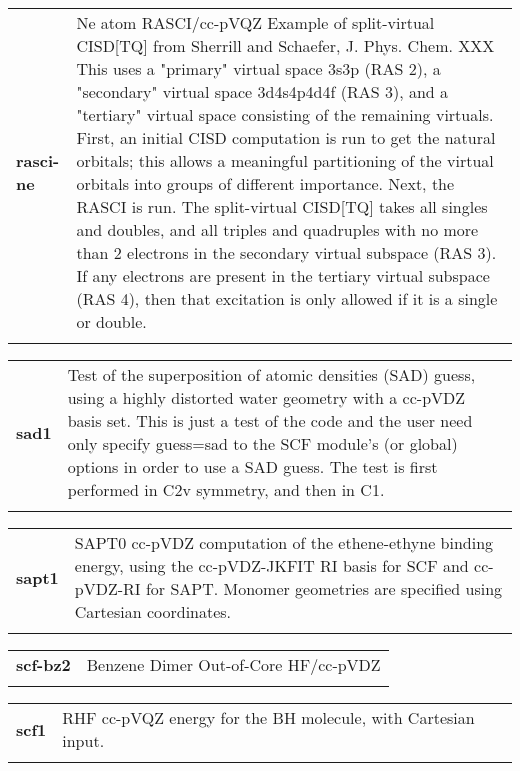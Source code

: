 \begin{tabular*}{\textwidth}[tb]{p{}p{}}
{\bf rasci-ne} &  Ne atom RASCI/cc-pVQZ  Example of split-virtual CISD[TQ] from Sherrill and Schaefer, J. Phys. Chem. XXX This uses a "primary" virtual space 3s3p (RAS 2), a "secondary" virtual space 3d4s4p4d4f (RAS 3), and a "tertiary" virtual space consisting of the remaining virtuals.  First, an initial CISD computation is run to get the natural orbitals; this allows a meaningful partitioning of the virtual orbitals into groups of different importance.  Next, the RASCI is run.  The split-virtual CISD[TQ] takes all singles and doubles, and all triples and quadruples with no more than 2 electrons in the secondary virtual subspace (RAS 3).  If any electrons are present in the tertiary virtual subspace (RAS 4), then that excitation is only allowed if it is a single or double. \\
\\
\end{tabular*}
\begin{tabular*}{\textwidth}[tb]{p{}p{}}
{\bf sad1} &  Test of the superposition of atomic densities (SAD) guess, using a highly distorted water geometry with a cc-pVDZ basis set.  This is just a test of the code and the user need only specify guess=sad to the SCF module's (or global) options in order to use a SAD guess. The test is first performed in C2v symmetry, and then in C1. \\
\\
\end{tabular*}
\begin{tabular*}{\textwidth}[tb]{p{}p{}}
{\bf sapt1} &  SAPT0 cc-pVDZ computation of the ethene-ethyne binding energy, using the cc-pVDZ-JKFIT RI basis for SCF and cc-pVDZ-RI for SAPT.  Monomer geometries are specified using Cartesian coordinates. \\
\\
\end{tabular*}
\begin{tabular*}{\textwidth}[tb]{p{}p{}}
{\bf scf-bz2} &  Benzene Dimer Out-of-Core HF/cc-pVDZ \\
\\
\end{tabular*}
\begin{tabular*}{\textwidth}[tb]{p{}p{}}
{\bf scf1} &  RHF cc-pVQZ energy for the BH molecule, with Cartesian input. \\
\\
\end{tabular*}
